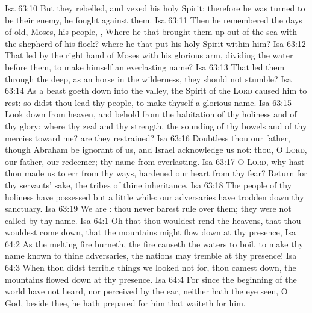 \vs Isa 63:10 But they rebelled, and vexed his holy Spirit: therefore he was turned to be their enemy,  he fought against them.
\vs Isa 63:11 Then he remembered the days of old, Moses,  his people, , Where  he that brought them up out of the sea with the shepherd of his flock? where  he that put his holy Spirit within him?
\vs Isa 63:12 That led  by the right hand of Moses with his glorious arm, dividing the water before them, to make himself an everlasting name?
\vs Isa 63:13 That led them through the deep, as an horse in the wilderness,  they should not stumble?
\vs Isa 63:14 As a beast goeth down into the valley, the Spirit of the \textsc{Lord} caused him to rest: so didst thou lead thy people, to make thyself a glorious name.
\vs Isa 63:15 Look down from heaven, and behold from the habitation of thy holiness and of thy glory: where  thy zeal and thy strength, the sounding of thy bowels and of thy mercies toward me? are they restrained?
\vs Isa 63:16 Doubtless thou  our father, though Abraham be ignorant of us, and Israel acknowledge us not: thou, O \textsc{Lord},  our father, our redeemer; thy name  from everlasting.
\vs Isa 63:17 O \textsc{Lord}, why hast thou made us to err from thy ways,  hardened our heart from thy fear? Return for thy servants' sake, the tribes of thine inheritance.
\vs Isa 63:18 The people of thy holiness have possessed  but a little while: our adversaries have trodden down thy sanctuary.
\vs Isa 63:19 We are : thou never barest rule over them; they were not called by thy name.
\vs Isa 64:1 Oh that thou wouldest rend the heavens, that thou wouldest come down, that the mountains might flow down at thy presence,
\vs Isa 64:2 As  the melting fire burneth, the fire causeth the waters to boil, to make thy name known to thine adversaries,  the nations may tremble at thy presence!
\vs Isa 64:3 When thou didst terrible things  we looked not for, thou camest down, the mountains flowed down at thy presence.
\vs Isa 64:4 For since the beginning of the world  have not heard, nor perceived by the ear, neither hath the eye seen, O God, beside thee,  he hath prepared for him that waiteth for him.
